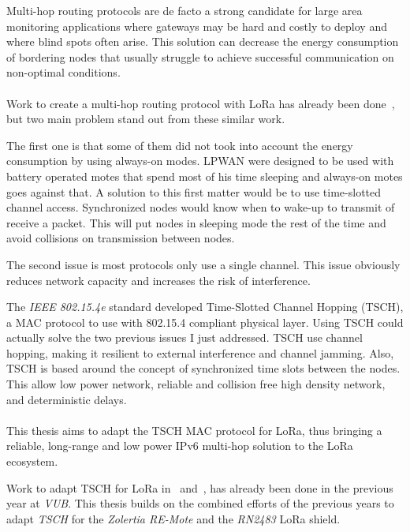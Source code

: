 Multi-hop routing protocols are de facto a strong candidate for large area monitoring 
applications where gateways may be hard and costly to deploy and where blind
spots often arise.
This solution can decrease the energy consumption of bordering nodes that
usually struggle to achieve successful communication on non-optimal
conditions.

\paragraph{}

Work to create a multi-hop routing protocol with LoRa has already been
done~\cite{8115756, DIAS2018424, 8856256, Abrardo_2019, duong2018}, 
but two main problem stand out from these similar work.

The first one is that some of them did not took into account the energy
consumption by using always-on modes. 
LPWAN were designed to be used with battery operated motes that spend most of
his time sleeping and always-on motes goes against that.
A solution to this first matter would be to use time-slotted channel access.
Synchronized nodes would know when to wake-up to transmit of receive a packet.
This will put nodes in sleeping mode the rest of the time and avoid collisions
on transmission between nodes.

The second issue is most protocols only use a single channel. 
This issue obviously reduces network capacity and increases the risk of 
interference.

The \emph{IEEE 802.15.4e} standard developed Time-Slotted Channel Hopping
(TSCH), a MAC protocol to use with 802.15.4 compliant physical layer.
Using TSCH could actually solve the two previous issues I just addressed.
TSCH use channel hopping, making it resilient to external interference and
channel jamming. 
Also, TSCH is based around the concept of synchronized time slots between the
nodes.
This allow low power network, reliable and collision free high density network,
and deterministic delays.

\paragraph{}

This thesis aims to adapt the TSCH MAC protocol for LoRa,
thus bringing a reliable, long-range and low power IPv6 multi-hop
solution to the LoRa ecosystem.

Work to adapt TSCH for LoRa in~\cite{8847137} and~\cite{njomgang_2018}, has
already been done in the previous year at \emph{VUB}.
This thesis builds on the combined efforts of the previous
years to adapt \emph{TSCH} for the \emph{Zolertia RE-Mote} and the
\emph{RN2483} LoRa shield.

